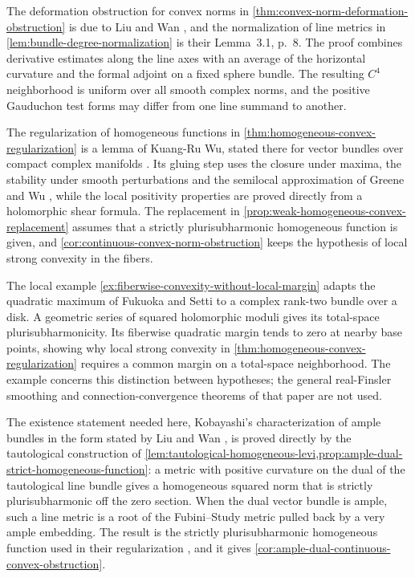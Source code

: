 The deformation obstruction for convex norms in \cref{thm:convex-norm-deformation-obstruction} is due to Liu and Wan \cite[v1, Theorem~3.2 and Sections~3.1--3.3, pp.~8--13]{LiuWanKobayashi26}, and the normalization of line metrics in \cref{lem:bundle-degree-normalization} is their Lemma~3.1, p.~8. The proof combines derivative estimates along the line axes with an average of the horizontal curvature and the formal adjoint on a fixed sphere bundle. The resulting $C^4$ neighborhood is uniform over all smooth complex norms, and the positive Gauduchon test forms may differ from one line summand to another.

The regularization of homogeneous functions in \cref{thm:homogeneous-convex-regularization} is a lemma of Kuang-Ru Wu, stated there for vector bundles over compact complex manifolds \cite[v1, Section~2.3, Lemma~13, pp.~10--13]{WuFinslerIII23}. Its gluing step uses the closure under maxima, the stability under smooth perturbations and the semilocal approximation of Greene and Wu \cite[Definitions~1.1, 1.3--1.4, pp.~48--49; Lemma~4.1 and Theorem~4.1, pp.~80--81]{GreeneWu79}, while the local positivity properties are proved directly from a holomorphic shear formula. The replacement in \cref{prop:weak-homogeneous-convex-replacement} assumes that a strictly plurisubharmonic homogeneous function is given, and \cref{cor:continuous-convex-norm-obstruction} keeps the hypothesis of local strong convexity in the fibers.

The local example \cref{ex:fiberwise-convexity-without-local-margin} adapts the quadratic maximum of Fukuoka and Setti \cite[v1, Example~3.18, p.~20]{FukuokaSettiStrongConvex26} to a complex rank-two bundle over a disk. A geometric series of squared holomorphic moduli gives its total-space plurisubharmonicity. Its fiberwise quadratic margin tends to zero at nearby base points, showing why local strong convexity in \cref{thm:homogeneous-convex-regularization} requires a common margin on a total-space neighborhood. The example concerns this distinction between hypotheses; the general real-Finsler smoothing and connection-convergence theorems of that paper are not used.

The existence statement needed here, Kobayashi's characterization of ample bundles in the form stated by Liu and Wan \cite[v1, Theorem~2.1, p.~7]{LiuWanKobayashi26}, is proved directly by the tautological construction of \cref{lem:tautological-homogeneous-levi,prop:ample-dual-strict-homogeneous-function}: a metric with positive curvature on the dual of the tautological line bundle gives a homogeneous squared norm that is strictly plurisubharmonic off the zero section. When the dual vector bundle is ample, such a line metric is a root of the Fubini--Study metric pulled back by a very ample embedding. The result is the strictly plurisubharmonic homogeneous function used in their regularization \cite[v1, Lemma~3.4, pp.~13--14]{LiuWanKobayashi26}, and it gives \cref{cor:ample-dual-continuous-convex-obstruction}.

